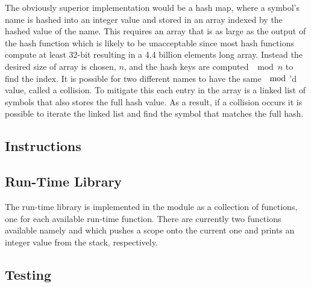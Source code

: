 The obviously superior implementation would be a hash map, where a symbol's name
is hashed into an integer value and stored in an array indexed by the hashed
value of the name. This requires an array that is as large as the output of the
hash function which is likely to be unacceptable since most hash functions
compute at least 32-bit resulting in a 4.4 billion elements long array. Instead
the desired size of array is chosen, $n$, and the hash keys are computed
$\mod n$ to find the index. It is possible for two different names to have the
same $\mod$'d value, called a collision. To mitigate this each entry in the
array is a linked list of symbols that also stores the full hash value. As a
result, if a collision occurs it is possible to iterate the linked list and find
the symbol that matches the full hash.

\subsection{Instructions}
\label{sec:implementation:instr}


\subsection{Run-Time Library}

The run-time library is implemented in the  module as a
collection of functions, one for each available run-time function. There are
currently two functions available namely  and 
which pushes a scope onto the current one and prints an integer value from the
stack, respectively.

\subsection{Testing}


